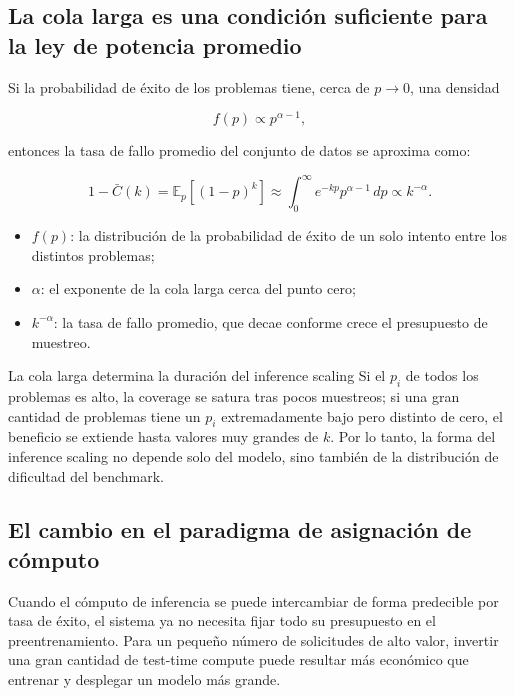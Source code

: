\subsection{La cola larga es una condición suficiente para la ley de potencia promedio}

Si la probabilidad de éxito de los problemas tiene, cerca de $p\rightarrow0$, una densidad

$$
f(p)\propto p^{\alpha-1},
$$

entonces la tasa de fallo promedio del conjunto de datos se aproxima como:

$$
1-\bar C(k)=\mathbb{E}_{p}[(1-p)^k]
\approx\int_{0}^{\infty} e^{-kp}p^{\alpha-1}\,dp
\propto k^{-\alpha}.
$$

\begin{itemize}
    \item $f(p)$: la distribución de la probabilidad de éxito de un solo intento entre los distintos problemas;
    \item $\alpha$: el exponente de la cola larga cerca del punto cero;
    \item $k^{-\alpha}$: la tasa de fallo promedio, que decae conforme crece el presupuesto de muestreo.
\end{itemize}


\begin{importantbox}{La cola larga determina la duración del inference scaling}
Si el $p_i$ de todos los problemas es alto, la coverage se satura tras pocos muestreos; si una gran cantidad de problemas tiene un $p_i$ extremadamente bajo pero distinto de cero, el beneficio se extiende hasta valores muy grandes de $k$. Por lo tanto, la forma del inference scaling no depende solo del modelo, sino también de la distribución de dificultad del benchmark.
\end{importantbox}

\subsection{El cambio en el paradigma de asignación de cómputo}

Cuando el cómputo de inferencia se puede intercambiar de forma predecible por tasa de éxito, el sistema ya no necesita fijar todo su presupuesto en el preentrenamiento. Para un pequeño número de solicitudes de alto valor, invertir una gran cantidad de test-time compute puede resultar más económico que entrenar y desplegar un modelo más grande.

